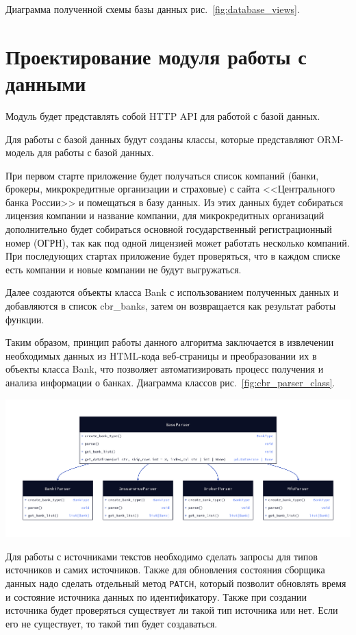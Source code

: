 \documentclass[PI, VKR]{HSEUniversity}
\begin{document}
Диаграмма полученной схемы базы данных рис.~\ref{fig:database_views}.
\section{Проектирование модуля работы с данными}
\label{sec:org81be798}
Модуль будет представлять собой HTTP API для работой с базой данных.

Для работы с базой данных будут созданы классы, которые представляют ORM-модель для работы с базой данных.

При первом старте приложение будет получаться список компаний (банки, брокеры, микрокредитные организации и страховые) с сайта {}<<Центрального банка России>>{} и помещаться в базу данных. Из этих данных будет собираться лицензия компании и название компании, для микрокредитных организаций дополнительно будет собираться основной государственный регистрационный номер (ОГРН), так как под одной лицензией может работать несколько компаний. При последующих стартах приложение будет проверяться, что в каждом списке есть компании и новые компании не будут выгружаться.

Далее создаются объекты класса Bank с использованием полученных данных и добавляются в список  cbr\_banks, затем он возвращается как результат работы функции.

Таким образом, принцип работы данного алгоритма заключается в извлечении необходимых данных из HTML-кода веб-страницы и преобразовании их в объекты класса Bank, что позволяет автоматизировать процесс получения и анализа информации о банках. Диаграмма классов рис.~\ref{fig:cbr_parser_class}.

\begin{center}
\includegraphics[width=.9\linewidth]{img/d2/cbr_parser_class.png}
\end{center}

Для работы с источниками текстов необходимо сделать запросы для типов источников и самих источников. Также для обновления состояния сборщика данных надо сделать отдельный метод \texttt{PATCH}, который позволит обновлять время и состояние источника данных по идентификатору. Также при создании источника будет проверяться существует ли такой тип источника или нет. Если его не существует, то такой тип будет создаваться.
\end{document}
